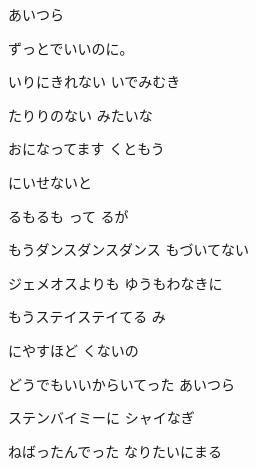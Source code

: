 \documentclass[a4paper,tate,twocolumn,12pt]{ltjtarticle}
\begin{document}
\thispagestyle{empty}

\begin{center}
{\LARGE あいつら}

{\large ずっとでいいのに。}
\end{center}

\vspace{1em}

\begin{flushleft}

\noindent\begin{minipage}{\linewidth}
いりにきれない いでみむき

たりりのない みたいな

おになってます くともう

にいせないと

るもるも って るが
\end{minipage}

\vspace{2em}

\noindent\begin{minipage}{\linewidth}
もうダンスダンスダンス もづいてない

ジェメオスよりも ゆうもわなきに

もうステイステイてる み

にやすほど くないの
\end{minipage}

\vspace{2em}

\noindent\begin{minipage}{\linewidth}
どうでもいいからいてった あいつら

ステンバイミーに シャイなぎ

ねばったんでった なりたいにまる


\end{minipage}
\end{flushleft}
\end{document}
